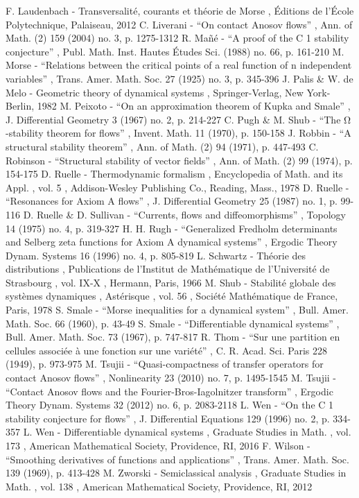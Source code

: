  F. Laudenbach - Transversalité, courants et théorie de Morse , Éditions de l’École Polytechnique, Palaiseau, 2012
 C. Liverani - “On contact Anosov flows” , Ann. of Math. (2) 159 (2004) no. 3, p. 1275-1312
 R. Mañé - “A proof of the C 1 stability conjecture” , Publ. Math. Inst. Hautes Études Sci. (1988) no. 66, p. 161-210
 M. Morse - “Relations between the critical points of a real function of n independent variables” , Trans. Amer. Math. Soc. 27 (1925) no. 3, p. 345-396
 J. Palis \& W. de Melo - Geometric theory of dynamical systems , Springer-Verlag, New York-Berlin, 1982
 M. Peixoto - “On an approximation theorem of Kupka and Smale” , J. Differential Geometry 3 (1967) no. 2, p. 214-227
 C. Pugh \& M. Shub - “The Ω -stability theorem for flows” , Invent. Math. 11 (1970), p. 150-158
 J. Robbin - “A structural stability theorem” , Ann. of Math. (2) 94 (1971), p. 447-493
 C. Robinson - “Structural stability of vector fields” , Ann. of Math. (2) 99 (1974), p. 154-175
 D. Ruelle - Thermodynamic formalism , Encyclopedia of Math. and its Appl. , vol. 5 , Addison-Wesley Publishing Co., Reading, Mass., 1978
 D. Ruelle - “Resonances for Axiom A flows” , J. Differential Geometry 25 (1987) no. 1, p. 99-116
 D. Ruelle \& D. Sullivan - “Currents, flows and diffeomorphisms” , Topology 14 (1975) no. 4, p. 319-327
 H. H. Rugh - “Generalized Fredholm determinants and Selberg zeta functions for Axiom A dynamical systems” , Ergodic Theory Dynam. Systems 16 (1996) no. 4, p. 805-819
 L. Schwartz - Théorie des distributions , Publications de l’Institut de Mathématique de l’Université de Strasbourg , vol. IX-X , Hermann, Paris, 1966
 M. Shub - Stabilité globale des systèmes dynamiques , Astérisque , vol. 56 , Société Mathématique de France, Paris, 1978
 S. Smale - “Morse inequalities for a dynamical system” , Bull. Amer. Math. Soc. 66 (1960), p. 43-49
 S. Smale - “Differentiable dynamical systems” , Bull. Amer. Math. Soc. 73 (1967), p. 747-817
 R. Thom - “Sur une partition en cellules associée à une fonction sur une variété” , C. R. Acad. Sci. Paris 228 (1949), p. 973-975
 M. Tsujii - “Quasi-compactness of transfer operators for contact Anosov flows” , Nonlinearity 23 (2010) no. 7, p. 1495-1545
 M. Tsujii - “Contact Anosov flows and the Fourier-Bros-Iagolnitzer transform” , Ergodic Theory Dynam. Systems 32 (2012) no. 6, p. 2083-2118
 L. Wen - “On the C 1 stability conjecture for flows” , J. Differential Equations 129 (1996) no. 2, p. 334-357
 L. Wen - Differentiable dynamical systems , Graduate Studies in Math. , vol. 173 , American Mathematical Society, Providence, RI, 2016
 F. Wilson - “Smoothing derivatives of functions and applications” , Trans. Amer. Math. Soc. 139 (1969), p. 413-428
 M. Zworski - Semiclassical analysis , Graduate Studies in Math. , vol. 138 , American Mathematical Society, Providence, RI, 2012
